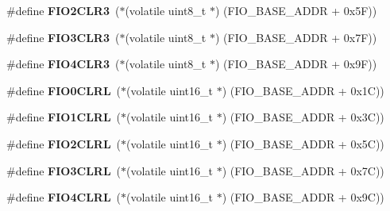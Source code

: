 \begin{DoxyCompactItemize}
\item 
\mbox{\label{group__lpc24xx__regs_ga6c862f58302d1e265297b023bf1b1c61}} 
\#define {\bfseries F\+I\+O2\+C\+L\+R3}~($\ast$(volatile uint8\+\_\+t $\ast$) (F\+I\+O\+\_\+\+B\+A\+S\+E\+\_\+\+A\+D\+DR + 0x5\+F))
\item 
\mbox{\label{group__lpc24xx__regs_ga28f99a4bca9ba138e3b99d81ea37bab9}} 
\#define {\bfseries F\+I\+O3\+C\+L\+R3}~($\ast$(volatile uint8\+\_\+t $\ast$) (F\+I\+O\+\_\+\+B\+A\+S\+E\+\_\+\+A\+D\+DR + 0x7\+F))
\item 
\mbox{\label{group__lpc24xx__regs_ga54ed30afd4c65f4f707157ed7319f2ed}} 
\#define {\bfseries F\+I\+O4\+C\+L\+R3}~($\ast$(volatile uint8\+\_\+t $\ast$) (F\+I\+O\+\_\+\+B\+A\+S\+E\+\_\+\+A\+D\+DR + 0x9\+F))
\item 
\mbox{\label{group__lpc24xx__regs_gae6eeb467744a7b35125c07bbae950517}} 
\#define {\bfseries F\+I\+O0\+C\+L\+RL}~($\ast$(volatile uint16\+\_\+t $\ast$) (F\+I\+O\+\_\+\+B\+A\+S\+E\+\_\+\+A\+D\+DR + 0x1\+C))
\item 
\mbox{\label{group__lpc24xx__regs_gae872d43c905b3ba9d7e69cc79b8e5b9f}} 
\#define {\bfseries F\+I\+O1\+C\+L\+RL}~($\ast$(volatile uint16\+\_\+t $\ast$) (F\+I\+O\+\_\+\+B\+A\+S\+E\+\_\+\+A\+D\+DR + 0x3\+C))
\item 
\mbox{\label{group__lpc24xx__regs_ga792108b016dcfc87694dc668c004d408}} 
\#define {\bfseries F\+I\+O2\+C\+L\+RL}~($\ast$(volatile uint16\+\_\+t $\ast$) (F\+I\+O\+\_\+\+B\+A\+S\+E\+\_\+\+A\+D\+DR + 0x5\+C))
\item 
\mbox{\label{group__lpc24xx__regs_ga5eede7ce337f9b6d752b843fac97e103}} 
\#define {\bfseries F\+I\+O3\+C\+L\+RL}~($\ast$(volatile uint16\+\_\+t $\ast$) (F\+I\+O\+\_\+\+B\+A\+S\+E\+\_\+\+A\+D\+DR + 0x7\+C))
\item 
\mbox{\label{group__lpc24xx__regs_ga7fa8669bacf724783b23650cc2b05fea}} 
\#define {\bfseries F\+I\+O4\+C\+L\+RL}~($\ast$(volatile uint16\+\_\+t $\ast$) (F\+I\+O\+\_\+\+B\+A\+S\+E\+\_\+\+A\+D\+DR + 0x9\+C))
\item 

\end{DoxyCompactItemize}
